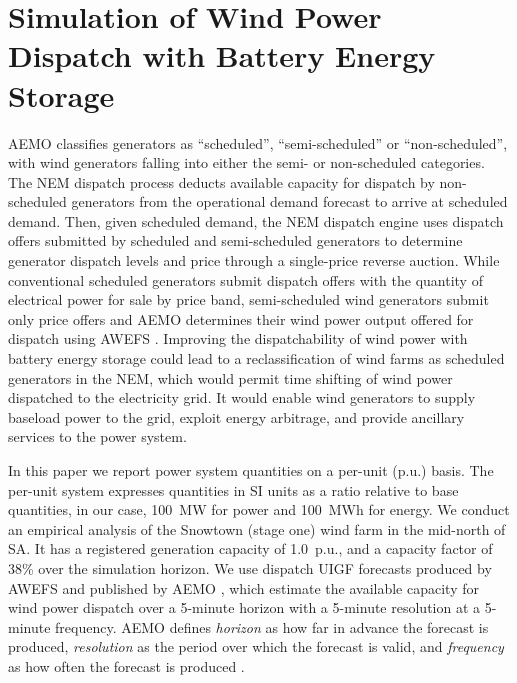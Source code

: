 \documentclass[conference]{IEEEtran}
\begin{document}
\section{Simulation of Wind Power Dispatch with Battery Energy Storage}\label{sect:sim_disp_wind_power_bess}
AEMO classifies generators as ``scheduled'', ``semi-scheduled'' or ``non-scheduled'', with wind generators falling into either the semi- or non-scheduled categories.  The NEM dispatch process deducts available capacity for dispatch by non-scheduled generators from the operational demand forecast to arrive at scheduled demand.  Then, given scheduled demand, the NEM dispatch engine uses dispatch offers submitted by scheduled and semi-scheduled generators to determine generator dispatch levels and price through a single-price reverse auction.  While conventional scheduled generators submit dispatch offers with the quantity of electrical power for sale by price band, semi-scheduled wind generators submit only price offers and AEMO determines their wind power output offered for dispatch using AWEFS \citep{AEMO14b}.  Improving the dispatchability of wind power with battery energy storage could lead to a reclassification of wind farms as scheduled generators in the NEM, which would permit time shifting of wind power dispatched to the electricity grid.  It would enable wind generators to supply baseload power to the grid, exploit energy arbitrage, and provide ancillary services to the power system.

In this paper we report power system quantities on a per-unit (p.u.) basis.  The per-unit system expresses quantities in SI units as a ratio relative to base quantities, in our case, 100~MW for power and 100~MWh for energy.  We conduct an empirical analysis of the Snowtown (stage one) wind farm in the mid-north of SA.  It has a registered generation capacity of 1.0~p.u., and a capacity factor of 38\% over the simulation horizon.  We use dispatch UIGF forecasts produced by AWEFS and published by AEMO \citep{AEMO16}, which estimate the available capacity for wind power dispatch over a 5-minute horizon with a 5-minute resolution at a 5-minute frequency.  AEMO defines \textit{horizon} as how far in advance the forecast is produced, \textit{resolution} as the period over which the forecast is valid, and \textit{frequency} as how often the forecast is produced \citep{AEMO14b}.
\end{document}
